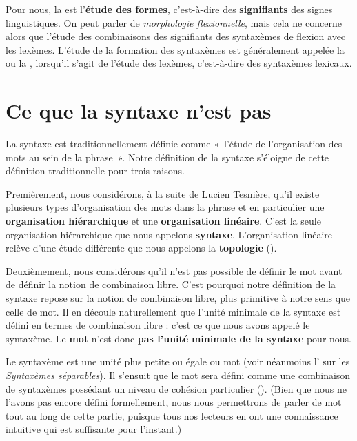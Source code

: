 Pour nous, la  est l’\textbf{étude des formes}, c’est-à-dire des \textbf{signifiants} des signes linguistiques. On peut parler de \textit{morphologie flexionnelle}, mais cela ne concerne alors que l’étude des combinaisons des signifiants des syntaxèmes de flexion avec les lexèmes. L’étude de la formation des syntaxèmes est généralement appelée la  ou la , lorsqu’il s’agit de l’étude des lexèmes, c’est-à-dire des syntaxèmes lexicaux.

\section{Ce que la syntaxe n’est pas}\label{sec:3.1.7}

La syntaxe est traditionnellement définie comme «~l’étude de l’organisation des mots au sein de la phrase~». Notre définition de la syntaxe s’éloigne de cette définition traditionnelle pour trois raisons.

Premièrement, nous considérons, à la suite de Lucien Tesnière, qu’il existe plusieurs types d’organisation des mots dans la phrase et en particulier une \textbf{organisation hiérarchique} et une \textbf{organisation linéaire}. C’est la seule organisation hiérarchique que nous appelons \textbf{syntaxe}. L’organisation linéaire relève d’une étude différente que nous appelons la \textbf{topologie} ().

Deuxièmement, nous considérons qu’il n’est pas possible de définir le mot avant de définir la notion de combinaison libre. C’est pourquoi notre définition de la syntaxe repose sur la notion de combinaison libre, plus primitive à notre sens que celle de mot. Il en découle naturellement que l’unité minimale de la syntaxe est défini en termes de combinaison libre : c’est ce que nous avons appelé le syntaxème. Le \textbf{mot} n’est donc \textbf{pas l’unité} \textbf{minimale de la syntaxe} pour nous.

Le syntaxème est une unité plus petite ou égale ou mot (voir néanmoins l’ sur les \textit{Syntaxèmes séparables}). Il s’ensuit que le mot sera défini comme une combinaison de syntaxèmes possédant un niveau de cohésion particulier (). (Bien que nous ne l’avons pas encore défini formellement, nous nous permettrons de parler de mot tout au long de cette partie, puisque tous nos lecteurs en ont une connaissance intuitive qui est suffisante pour l’instant.)

